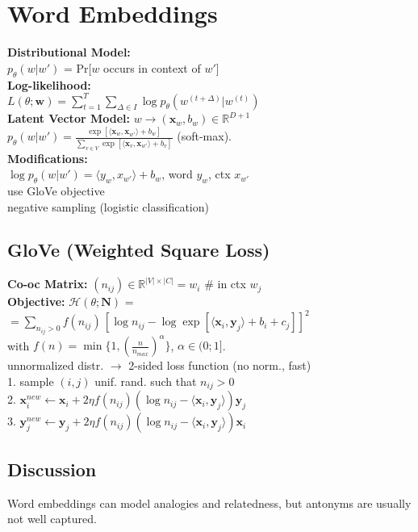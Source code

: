 \section{Word Embeddings}
\textbf{Distributional Model:}\\
$p_\theta(w|w')$ = Pr[$w$ occurs in context of $w'$]\\
\textbf{Log-likelihood:}\\
$L(\theta; \mathbf{w}) = \sum_{t=1}^T\sum_{\Delta \in I}{\log p_\theta(w^{(t+\Delta)}|w^{(t)})}$\\
\textbf{Latent Vector Model:} $w \rightarrow (\mathbf{x}_w, b_w) \in \mathbb{R}^{D+1}$ \\$p_{\theta}(w|w') = \frac{\exp[\langle \mathbf{x}_w,\mathbf{x}_{w'}\rangle + b_w]}{\sum_{v\in V}{\exp[\langle \mathbf{x}_v,\mathbf{x}_{w'}\rangle + b_v ]}}$ (soft-max).\\
\textbf{Modifications:}\\
$\log p_{\theta}(w|w') = \langle  y_{w} , x_{w'} \rangle + b_w$,  word $y_w$, ctx $x_{w'}$\\
use GloVe objective\\
negative sampling (logistic classification)

\subsection*{GloVe (Weighted Square Loss)}
\textbf{Co-oc Matrix:} $(n_{ij}) \in \mathbb{R}^{|V|\times|C|} = w_i$ \# in ctx $w_j$\\
\textbf{Objective:} $\mathcal{H}(\theta;\mathbf{N})$ =\\
$= \sum_{n_{ij} > 0} f(n_{ij})\,[\log n_{ij} - \log \exp[\langle \mathbf{x}_i, \mathbf{y}_j \rangle + b_i + c_j]]^2$\\
with $f(n) = \min\{1, (\frac{n}{n_{max}})^\alpha\}$, $\alpha \in (0;1]$.\\
unnormalized distr. $\rightarrow$ 2-sided loss function (no norm., fast)\\
1. sample $(i,j)$ unif. rand. such that $n_{ij}>0$\\
2. $\mathbf{x}_i^{new} \leftarrow \mathbf{x}_i + 2\eta f(n_{ij})(\log n_{ij} - \langle \mathbf{x}_i, \mathbf{y}_j \rangle)\mathbf{y}_j$\\
3. $\mathbf{y}_j^{new} \leftarrow \mathbf{y}_j + 2\eta f(n_{ij})(\log n_{ij} - \langle \mathbf{x}_i, \mathbf{y}_j \rangle)\mathbf{x}_i$

\subsection*{Discussion}
Word embeddings can model analogies and relatedness, but antonyms are usually not well captured.
